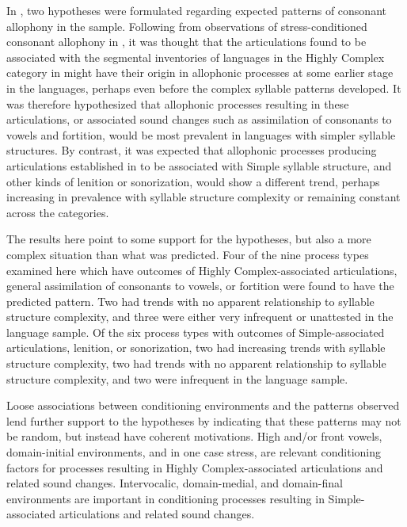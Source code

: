   In , two hypotheses were formulated regarding expected patterns of consonant allophony in the sample. Following from observations of stress-conditioned consonant allophony in , it was thought that the articulations found to be associated with the segmental inventories of languages in the Highly Complex category in  might have their origin in allophonic processes at some earlier stage in the languages, perhaps even before the complex syllable patterns developed. It was therefore hypothesized that allophonic processes resulting in these articulations, or associated sound changes such as assimilation of consonants to vowels and fortition, would be most prevalent in languages with simpler syllable structures. By contrast, it was expected that allophonic processes producing articulations established in  to be associated with Simple syllable structure, and other kinds of lenition or sonorization, would show a different trend, perhaps increasing in prevalence with syllable structure complexity or remaining constant across the categories.

  The results here point to some support for the hypotheses, but also a more complex situation than what was predicted. Four of the nine process types examined here which have outcomes of Highly Complex-associated articulations, general assimilation of consonants to vowels, or fortition were found to have the predicted pattern. Two had trends with no apparent relationship to syllable structure complexity, and three were either very infrequent or unattested in the language sample. Of the six process types with outcomes of Simple-associated articulations, lenition, or sonorization, two had increasing trends with syllable structure complexity, two had trends with no apparent relationship to syllable structure complexity, and two were infrequent in the language sample.

  Loose associations between conditioning environments and the patterns observed lend further support to the hypotheses by indicating that these patterns may not be random, but instead have coherent motivations. High and/or front vowels, domain-initial environments, and in one case stress, are relevant conditioning factors for processes resulting in Highly Complex-associated articulations and related sound changes. Intervocalic, domain-medial, and domain-final environments are important in conditioning processes resulting in Simple-associated articulations and related sound changes. 

